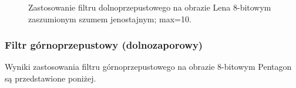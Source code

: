 \documentclass{classrep}
\begin{document}
\begin{figure}[H]
    \qquad
    \qquad
    \qquad
    \caption{Zastosowanie filtru dolnoprzepustowego na obrazie Lena 8-bitowym zaszumionym szumem jenostajnym; max=10.}%
\end{figure}  

\subsubsection{Filtr górnoprzepustowy (dolnozaporowy)}
Wyniki zastosowania filtru górnoprzepustowego na obrazie 8-bitowym Pentagon są przedstawione poniżej. 
\end{document}
